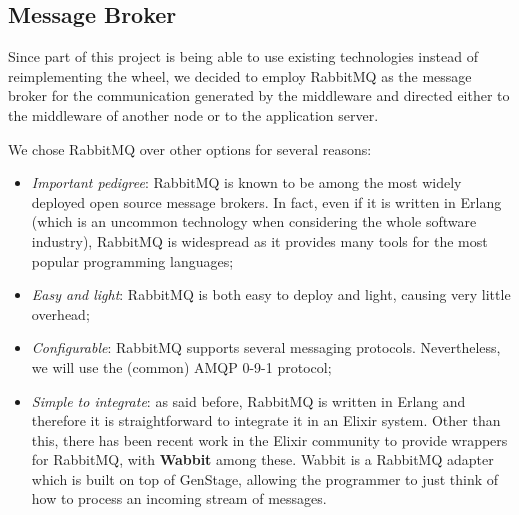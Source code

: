 \subsection{Message Broker}
Since part of this project is being able to use existing technologies instead of
reimplementing the wheel, we decided to employ RabbitMQ as the message broker
for the communication generated by the middleware and directed either to
the middleware of another node or to the application server.

We chose RabbitMQ over other options for several reasons:
\begin{itemize}
  \item \textit{Important pedigree}: RabbitMQ is known to be among the
        most widely deployed open source message brokers. In fact, even if it
        is written in Erlang (which is an uncommon technology when considering
        the whole software industry), RabbitMQ is widespread as it provides
        many tools for the most popular programming languages;
  \item \textit{Easy and light}: RabbitMQ is both easy to deploy and light,
    causing very little overhead;
  \item \textit{Configurable}: RabbitMQ supports several messaging protocols.
        Nevertheless, we will use the (common) AMQP 0-9-1 protocol;
  \item \textit{Simple to integrate}: as said before, RabbitMQ is written in
        Erlang and therefore it is straightforward to integrate it in an Elixir
        system.
        Other than this, there has been recent work in the Elixir community to
        provide wrappers for RabbitMQ, with \textbf{Wabbit} among these. Wabbit
        is a RabbitMQ adapter which is built on top of GenStage, allowing the
        programmer to just think of how to process an incoming stream of
        messages.
\end{itemize}
